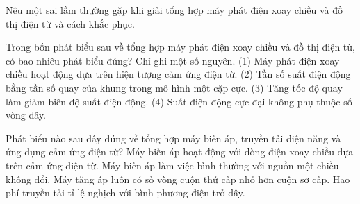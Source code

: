 \begin{bt}
Nêu một sai lầm thường gặp khi giải tổng hợp máy phát điện xoay chiều và đồ thị điện từ và cách khắc phục.
\end{bt}

\begin{ex}
Trong bốn phát biểu sau về tổng hợp máy phát điện xoay chiều và đồ thị điện từ, có bao nhiêu phát biểu đúng? Chỉ ghi một số nguyên. (1) Máy phát điện xoay chiều hoạt động dựa trên hiện tượng cảm ứng điện từ. (2) Tần số suất điện động bằng tần số quay của khung trong mô hình một cặp cực. (3) Tăng tốc độ quay làm giảm biên độ suất điện động. (4) Suất điện động cực đại không phụ thuộc số vòng dây.
\end{ex}

\begin{ex}
Phát biểu nào sau đây đúng về tổng hợp máy biến áp, truyền tải điện năng và ứng dụng cảm ứng điện từ?
\choice
{\True Máy biến áp hoạt động với dòng điện xoay chiều dựa trên cảm ứng điện từ.}
{Máy biến áp làm việc bình thường với nguồn một chiều không đổi.}
{Máy tăng áp luôn có số vòng cuộn thứ cấp nhỏ hơn cuộn sơ cấp.}
{Hao phí truyền tải tỉ lệ nghịch với bình phương điện trở dây.}
\end{ex}

